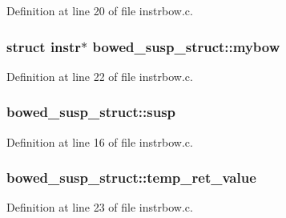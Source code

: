 Definition at line 20 of file instrbow.\+c.

\subsubsection[{\texorpdfstring{mybow}{mybow}}]{\setlength{\rightskip}{0pt plus 5cm}struct {\bf instr}$\ast$ bowed\+\_\+susp\+\_\+struct\+::mybow}\hypertarget{structbowed__susp__struct_ac07da92a930c8d139ba9ed7945953f15}{}\label{structbowed__susp__struct_ac07da92a930c8d139ba9ed7945953f15}


Definition at line 22 of file instrbow.\+c.

\subsubsection[{\texorpdfstring{susp}{susp}}]{ bowed\+\_\+susp\+\_\+struct\+::susp}\hypertarget{structbowed__susp__struct_a0b9c9ecf375c072584afd8ceccda1e0e}{}\label{structbowed__susp__struct_a0b9c9ecf375c072584afd8ceccda1e0e}


Definition at line 16 of file instrbow.\+c.

\subsubsection[{\texorpdfstring{temp\+\_\+ret\+\_\+value}{temp_ret_value}}]{ bowed\+\_\+susp\+\_\+struct\+::temp\+\_\+ret\+\_\+value}\hypertarget{structbowed__susp__struct_ac4df431025675a1f6878d88fbdc3280d}{}\label{structbowed__susp__struct_ac4df431025675a1f6878d88fbdc3280d}


Definition at line 23 of file instrbow.\+c.

